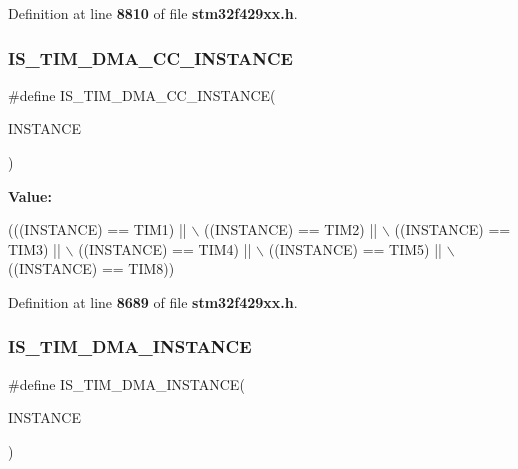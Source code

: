 Definition at line \textbf{ 8810} of file \textbf{ stm32f429xx.\+h}.

\mbox{\label{group__Exported__macros_gad80a186286ce3daa92249a8d52111aaf}} 
\subsubsection{I\+S\+\_\+\+T\+I\+M\+\_\+\+D\+M\+A\+\_\+\+C\+C\+\_\+\+I\+N\+S\+T\+A\+N\+CE}
{\footnotesize\ttfamily \#define I\+S\+\_\+\+T\+I\+M\+\_\+\+D\+M\+A\+\_\+\+C\+C\+\_\+\+I\+N\+S\+T\+A\+N\+CE(\begin{DoxyParamCaption}\item[{}]{I\+N\+S\+T\+A\+N\+CE }\end{DoxyParamCaption})}

{\bfseries Value\+:}
\begin{DoxyCode}
(((INSTANCE) == TIM1) || \(\backslash\)
                                          ((INSTANCE) == TIM2) || \(\backslash\)
                                          ((INSTANCE) == TIM3) || \(\backslash\)
                                          ((INSTANCE) == TIM4) || \(\backslash\)
                                          ((INSTANCE) == TIM5) || \(\backslash\)
                                          ((INSTANCE) == TIM8))
\end{DoxyCode}


Definition at line \textbf{ 8689} of file \textbf{ stm32f429xx.\+h}.

\mbox{\label{group__Exported__macros_gad51d77b3bcc12a3a5c308d727b561371}} 
\subsubsection{I\+S\+\_\+\+T\+I\+M\+\_\+\+D\+M\+A\+\_\+\+I\+N\+S\+T\+A\+N\+CE}
{\footnotesize\ttfamily \#define I\+S\+\_\+\+T\+I\+M\+\_\+\+D\+M\+A\+\_\+\+I\+N\+S\+T\+A\+N\+CE(\begin{DoxyParamCaption}\item[{}]{I\+N\+S\+T\+A\+N\+CE }\end{DoxyParamCaption})}

